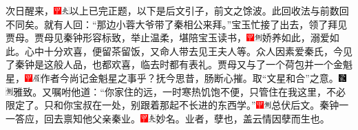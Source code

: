 次日醒来，{\includegraphics[width=3mm]{../Images/00002}\includegraphics[width=3mm]{../Images/00012}\footnotesize \kaishu 以上已完正题，以下是后文引子，前文之馀波。此回收法与前数回不同矣。}就有人回：``那边小蓉大爷带了秦相公来拜。''宝玉忙接了出去，领了拜见贾母。贾母见秦钟形容标致，举止温柔，堪陪宝玉读书，{\includegraphics[width=3mm]{../Images/00002}\includegraphics[width=3mm]{../Images/00011}\footnotesize \kaishu 娇养如此，溺爱如此。}心中十分欢喜，便留茶留饭，又命人带去见王夫人等。众人因素爱秦氏，今见了秦钟是这般人品，也都欢喜，临去时都有表礼。贾母又与了一个荷包并一个金魁星，{\includegraphics[width=3mm]{../Images/00002}\includegraphics[width=3mm]{../Images/00010}\footnotesize \kaishu 作者今尚记金魁星之事乎？抚今思昔，肠断心摧。}取``文星和合''之意。{\includegraphics[width=3mm]{../Images/00006}\includegraphics[width=3mm]{../Images/00011}\footnotesize \kaishu 雅致。}又嘱咐他道：``你家住的远，一时寒热饥饱不便，只管住在我这里，不必限定了。只和你宝叔在一处，别跟着那起不长进的东西学。''{\includegraphics[width=3mm]{../Images/00002}\includegraphics[width=3mm]{../Images/00011}\footnotesize \kaishu 总伏后文。}秦钟一一答应，回去禀知他父亲秦业。{\includegraphics[width=3mm]{../Images/00002}\includegraphics[width=3mm]{../Images/00012}\footnotesize \kaishu 妙名。业者，孽也，盖云情因孽而生也。}

